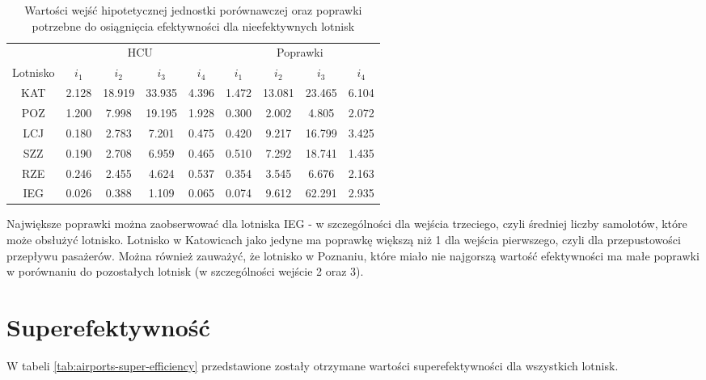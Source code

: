 \documentclass[a4paper,12pt]{article}
\begin{document}
\begin{table}[H]
    \centering
    \begin{tabular}{c|cccc|cccc}
    \hline
        & \multicolumn{4}{c|}{HCU} & \multicolumn{4}{c}{Poprawki}  \\
         Lotnisko & $i_1$ & $i_2$ & $i_3$ & $i_4$ & $i_1$ & $i_2$ & $i_3$ & $i_4$ \\ \hline
        KAT & 2.128 & 18.919 & 33.935 & 4.396 & 1.472 & 13.081 & 23.465 & 6.104 \\
        POZ & 1.200 & 7.998 & 19.195 & 1.928 & 0.300 & 2.002 & 4.805 & 2.072 \\
        LCJ & 0.180 & 2.783 & 7.201 & 0.475 & 0.420 & 9.217 & 16.799 & 3.425 \\
        SZZ & 0.190 & 2.708 & 6.959 & 0.465 & 0.510 & 7.292 & 18.741 & 1.435 \\
        RZE & 0.246 & 2.455 & 4.624 & 0.537 & 0.354 & 3.545 & 6.676 & 2.163 \\
        IEG & 0.026 & 0.388 & 1.109 & 0.065 & 0.074 & 9.612 & 62.291 & 2.935 \\    
    \hline
    \end{tabular}
    \caption{Wartości wejść hipotetycznej jednostki porównawczej oraz poprawki potrzebne do osiągnięcia efektywności dla nieefektywnych lotnisk }
    \label{tab:airports-hcu-and-improvements}
\end{table}

\noindent Największe poprawki można zaobserwować dla lotniska IEG - w szczególności dla wejścia trzeciego, czyli średniej liczby samolotów, które może obsłużyć lotnisko.
Lotnisko w Katowicach jako jedyne ma poprawkę większą niż 1 dla wejścia pierwszego, czyli dla przepustowości przepływu pasażerów. 
Można również zauważyć, że lotnisko w Poznaniu, które miało nie najgorszą wartość efektywności ma małe poprawki w porównaniu do pozostałych lotnisk (w szczególności wejście 2 oraz 3).

\section{Superefektywność}

W tabeli \ref{tab:airports-super-efficiency} przedstawione zostały otrzymane wartości superefektywności dla wszystkich lotnisk.
\end{document}
